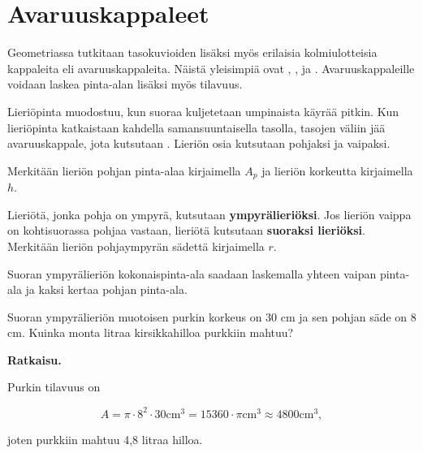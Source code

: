 \section*{Avaruuskappaleet}
Geometriassa tutkitaan tasokuvioiden lisäksi myös erilaisia kolmiulotteisia kappaleita eli avaruuskappaleita. Näistä yleisimpiä ovat , ,  ja . Avaruuskappaleille voidaan laskea pinta-alan lisäksi myös tilavuus.


Lieriöpinta muodostuu, kun suoraa kuljetetaan umpinaista käyrää pitkin. Kun lieriöpinta katkaistaan kahdella samansuuntaisella tasolla, tasojen väliin jää avaruuskappale, jota kutsutaan . Lieriön osia kutsutaan pohjaksi ja vaipaksi.

Merkitään lieriön pohjan pinta-alaa kirjaimella $A_p$ ja lieriön korkeutta kirjaimella $h$.


Lieriötä, jonka pohja on ympyrä, kutsutaan \textbf{ympyrälieriöksi}. Jos lieriön vaippa on kohtisuorassa pohjaa vastaan, lieriötä kutsutaan \textbf{suoraksi lieriöksi}. Merkitään lieriön pohjaympyrän sädettä kirjaimella $r$.


Suoran ympyrälieriön kokonaispinta-ala saadaan laskemalla yhteen vaipan pinta-ala ja kaksi kertaa pohjan pinta-ala.


\begin{esimerkki}
Suoran ympyrälieriön muotoisen purkin korkeus on 30 cm ja sen pohjan säde on 8 cm. Kuinka monta litraa kirsikkahilloa purkkiin mahtuu?

\textbf{Ratkaisu.}

Purkin tilavuus on

$$A=\pi\cdot 8^2 \cdot 30 \text{cm}^3 = 15360 \cdot \pi \text{cm}^3 \approx 4800 \text{cm}^3,$$

joten purkkiin mahtuu 4,8 litraa hilloa.
\end{esimerkki}

